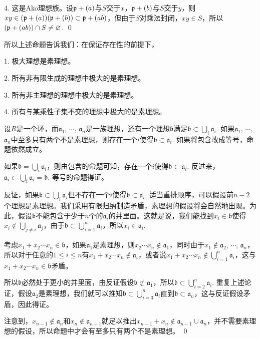 	4. 这是Ako理想族。设$\mathfrak{p}+(a)$与$S$交于$x$，$\mathfrak{p}+(b)$与$S$交于$y$，则$xy\in (\mathfrak{p}+(a))(\mathfrak{p}+(b))\subset \mathfrak{p}+(ab)$，但由于$S$对乘法封闭，$xy\in S$，所以$(\mathfrak{p}+(ab))\cap S\neq \varnothing$.
\qed

所以上述命题告诉我们：在保证存在性的前提下，

	1. 极大理想是素理想。

	2. 所有非有限生成的理想中极大的是素理想。

	3. 所有非主理想的理想中极大的是素理想。

	4. 所有与某乘性子集不交的理想中极大的是素理想。

\pro \label{primeav}设$R$是一个环，而$\mathfrak{a}_1$, $\cdots$, $\mathfrak{a}_n$是一族理想，还有一个理想$\mathfrak{b}$满足$\mathfrak{b}\subset \bigcup_i \mathfrak{a}_i$. 如果$\mathfrak{a}_1$, $\cdots$, $\mathfrak{a}_n$中至多只有两个不是素理想，则存在一个$i$使得$\mathfrak{b}\subset \mathfrak{a}_i$. 如果将包含改成等号，命题依然成立。

\proof
	如果$\mathfrak{b}=\bigcup_i \mathfrak{a}_i$，则由包含的命题可知，存在一个$i$使得$\mathfrak{b}\subset \mathfrak{a}_i$. 反过来，$\mathfrak{a}_i\subset \bigcup_i \mathfrak{a}_i=\mathfrak{b}$. 等号的命题得证。

	反证，如果$\mathfrak{b}\subset \bigcup_i \mathfrak{a}_i$但不存在一个$i$使得$\mathfrak{b}\subset \mathfrak{a}_i$. 适当重排顺序，可以假设前$n-2$个理想是素理想。我们采用有限归纳制造矛盾，素理想的假设将会自然地出现。为此，假设$\mathfrak{b}$不能包含于少于$n$个的$\mathfrak{a}_i$的并里面。这就是说，我们能找到$x_i\in \mathfrak{b}$使得$x_i\not\in \bigcup_{j\neq i}\mathfrak{a}_j$，由于$\mathfrak{b}\subset \bigcup_{i=1}^n \mathfrak{a}_i$，所以$x_i\in \mathfrak{a}_i$.

	考虑$x_1+x_2\cdots x_n\in \mathfrak{b}$，如果$\mathfrak{a}_1$是素理想，则$x_2\cdots x_n\not\in \mathfrak{a}_1$，同时由于$x_1\not\in \mathfrak{a}_2$, $\cdots$, $\mathfrak{a}_n$，所以对于任意的$1\leq i \leq n$有$x_1+x_2\cdots x_n\not\in \mathfrak{a}_i$，或者说$x_1+x_2\cdots x_n\not\in \bigcup_{i=1}^n \mathfrak{a}_i$，这与$x_1+x_2\cdots x_n\in \mathfrak{b}$矛盾。

	所以$\mathfrak{b}$必然处于更小的并里面，由反证假设$\mathfrak{b}\not\subset \mathfrak{a}_1$，所以$\mathfrak{b}\subset \bigcup_{i=2}^n \mathfrak{a}_i$. 重复上述论证，假设$\mathfrak{a}_2$是素理想，我们就可以推知$\mathfrak{b}\subset \bigcup_{i=3}^n \mathfrak{a}_i$直到$\mathfrak{b}\subset \mathfrak{a}_n$，这与反证假设矛盾，因此得证。 

	注意到，$x_{n-1}\not\in \mathfrak{a}_n$和$x_{n}\not\in \mathfrak{a}_{n-1}$就足以推出$x_{n-1}+x_{n}\not\in \mathfrak{a}_{n-1}\cup \mathfrak{a}_n$，并不需要素理想的假设，所以命题中才会有至多只有两个不是素理想。
\qed

